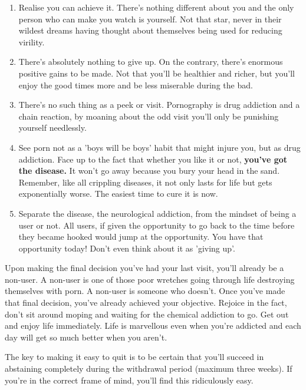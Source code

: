 \documentclass[easypeasy]{subfiles}
\begin{document}
\begin{enumerate}
  \item Realise you can achieve it. There's nothing different about you and the only person who can make you watch is yourself. Not that star, never in their wildest dreams having thought about themselves being used for reducing virility.
  \item There's absolutely nothing to give up. On the contrary, there's enormous positive gains to be made. Not that you'll be healthier and richer, but you'll enjoy the good times more and be less miserable during the bad.
  \item There's no such thing as a peek or visit. Pornography is drug addiction and a chain reaction, by moaning about the odd visit you'll only be punishing yourself needlessly.
  \item See porn not as a 'boys will be boys' habit that might injure you, but as drug addiction. Face up to the fact that whether you like it or not, \textbf{you've got the disease.} It won't go away because you bury your head in the sand. Remember, like all crippling diseases, it not only lasts for life but gets exponentially worse. The easiest time to cure it is now.
  \item Separate the disease, the neurological addiction, from the mindset of being a user or not. All users, if given the opportunity to go back to the time before they became hooked would jump at the opportunity. You have that opportunity today! Don't even think about it as 'giving up'.

\end{enumerate}

Upon making the final decision you've had your last visit, you'll already be a non-user. A non-user is one of those poor wretches going through life destroying themselves with porn. A non-user is someone who doesn't. Once you've made that final decision, you've already achieved your objective. Rejoice in the fact, don't sit around moping and waiting for the chemical addiction to go. Get out and enjoy life immediately. Life is marvellous even when you're addicted and each day will get so much better when you aren't.

The key to making it easy to quit is to be certain that you'll succeed in abstaining completely during the withdrawal period (maximum three weeks). If you're in the correct frame of mind, you'll find this ridiculously easy.
\end{document}
